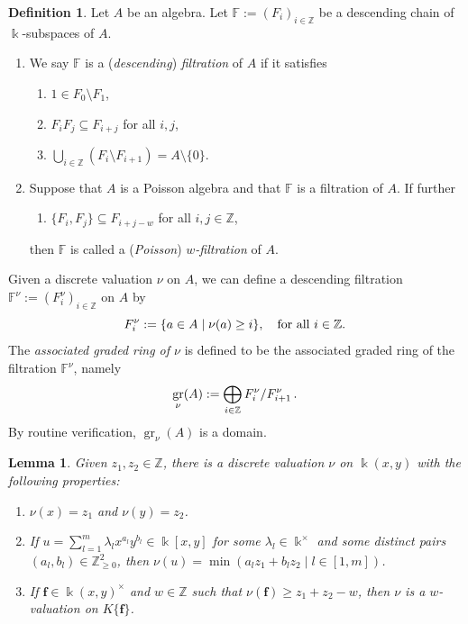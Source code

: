\documentclass[12pt]{amsart}
\theoremstyle{plain}
\newtheorem{lemma}[theorem]{Lemma}
\numberwithin{theorem}{section}
\numberwithin{equation}{theorem}
\theoremstyle{definition}
\newtheorem{definition}[theorem]{Definition}
\newcommand{\FF}{\mathbb{F}}
\newcommand{\ZZ}{\mathbb{Z}}
\DeclareMathOperator{\gr}{gr}
\newcommand \bff {{\mathbf{f}}}
\newcommand \Znn {\ZZ_{\ge 0}}
\newcommand \kx {\Bbbk^\times}
\begin{document}
\begin{definition}
\label{zzdef3.3}
Let $A$ be an algebra. Let
${\FF}:= (F_{i})_{i\in {\ZZ}}$
be a descending chain of $\Bbbk$-subspaces 
of $A$. 
\begin{enumerate}
\item[(1)] 
We say ${\FF}$ is a (\emph{descending})
\emph{filtration} of $A$ if it satisfies
\begin{enumerate}
\item[(a)]
$1 \in F_0\setminus F_{1}$, 
\item[(b)]
$F_i F_j\subseteq F_{i+j}$ for all $i,j$,
\item[(c)]
$\bigcup_{i\in {\ZZ}} (F_i\setminus F_{i+1})
=A\setminus \{0\}$.
\end{enumerate}
\item[(2)]
Suppose that $A$ is a Poisson algebra and 
that ${\FF}$ is a filtration of $A$. If 
further
\begin{enumerate}
\item[(d)]
$\{F_{i},F_{j}\}\subseteq F_{i+j-w}$ for 
all $i,j\in {\ZZ}$, 
\end{enumerate}
then ${\FF}$ is called a (\emph{Poisson})
\emph{$w$-filtration} of $A$.
\end{enumerate}
\end{definition}

Given a discrete valuation $\nu$ on $A$, we 
can define a descending filtration
${\FF}^{\nu}:= (F^{\nu}_i)_{i\in {\ZZ}}$ on 
$A$ by
\begin{equation}
\notag
F^{\nu}_i:=\{a\in A\mid \nu(a)\geq i\}, 
\quad {\text{for all $i \in \ZZ$}}.
\end{equation}
The {\it associated graded ring of $\nu$} 
is defined to be the associated graded ring 
of the filtration $\FF^\nu$, namely 
\begin{equation}
\notag
\gr_{\nu}(A):= \bigoplus_{i\in {\ZZ}} F^{\nu}_i/F^{\nu}_{i+1} \,.
\end{equation}
By routine verification, $\gr_{\nu}(A)$ is 
a domain.

\begin{lemma}  
\label{zzlem3.4}
Given $z_1,z_2 \in \ZZ$, there is a 
discrete valuation $\nu$ on $\Bbbk(x,y)$
with the following properties:
\begin{enumerate}
\item[(1)] 
$\nu(x) = z_1$ and $\nu(y) = z_2$.
\item[(2)]
If $u = \sum_{l=1}^m \lambda_l x^{a_l} y^{b_l} \in \Bbbk[x,y]$ for some $\lambda_l \in \kx$ and some distinct pairs $(a_l,b_l) \in \Znn^2$, then $\nu(u) = \min( a_lz_1+b_lz_2 \mid l \in [1,m] )$.
\item[(3)]
If $\bff \in \Bbbk(x,y)^\times$ and 
$w \in \ZZ$ such that $\nu(\bff) \ge 
z_1+z_2-w$, then $\nu$ is a $w$-valuation 
on $K\{\bff\}$. 
\end{enumerate}
\end{lemma}
\end{document}
